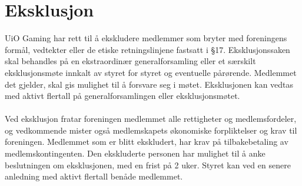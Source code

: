 \documentclass[12pt,a4paper,norsk]{article}
\begin{document}
\section{Eksklusjon}

UiO Gaming har rett til å ekskludere medlemmer som bryter med foreningens formål, vedtekter eller de etiske retningslinjene fastsatt i §17. Eksklusjonssaken skal behandles på en ekstraordinær generalforsamling eller et særskilt eksklusjonsmøte innkalt av styret for styret og eventuelle pårørende. Medlemmet det gjelder, skal gis mulighet til å forsvare seg i møtet. Eksklusjonen kan vedtas med  aktivt flertall på generalforsamlingen eller eksklusjonsmøtet. 
\\
\\
Ved eksklusjon fratar foreningen medlemmet alle rettigheter og medlemsfordeler, og vedkommende mister også medlemskapets økonomiske forpliktelser og krav til foreningen. Medlemmet som er blitt ekskludert, har krav på tilbakebetaling av medlemskontingenten. Den ekskluderte personen har mulighet til å anke beslutningen om eksklusjonen, med en frist på 2 uker. Styret kan ved en senere anledning med  aktivt flertall benåde medlemmet.
\end{document}

